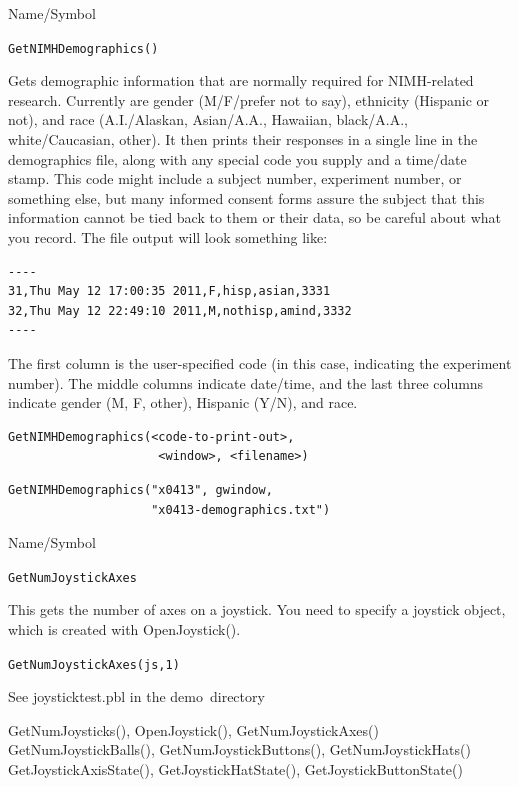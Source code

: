 \begin{desc}{Name/Symbol}
\item[Name/Symbol]	\verb+GetNIMHDemographics()+

\item[Description]	Gets demographic information that are normally required for NIMH-related research.  Currently are gender (M/F/prefer not to say), ethnicity (Hispanic or not), and race (A.I./Alaskan, Asian/A.A., Hawaiian, black/A.A., white/Caucasian, other).  
		It then prints their responses in a single line in the demographics file, along with any special code you supply and a time/date stamp. This code might include a subject number, experiment number, or something else, but many informed consent forms assure the subject that this information cannot be tied back to them or their data, so be careful about what you record. The file output will look something like: 
\begin{verbatim}
---- 
31,Thu May 12 17:00:35 2011,F,hisp,asian,3331
32,Thu May 12 22:49:10 2011,M,nothisp,amind,3332
---- 
\end{verbatim}


	The first column is the user-specified code (in this 
	case, indicating the experiment number).  The middle columns 
	indicate date/time, and the last three columns indicate 
	gender (M, F, other), Hispanic (Y/N), and race.

\item[Usage]
\begin{verbatim}
GetNIMHDemographics(<code-to-print-out>,
                     <window>, <filename>)
\end{verbatim} 

\item[Example]
\begin{verbatim}
GetNIMHDemographics("x0413", gwindow, 
                    "x0413-demographics.txt")
\end{verbatim}

\item[See Also]	
\end{desc}


\begin{desc}{Name/Symbol}
\item[Name/Symbol] \verb+GetNumJoystickAxes+ 

\item[Description]  
  This gets the number of axes on a joystick.  You need to specify a joystick object, which is created with OpenJoystick(). 

\item[Usage]          \verb+GetNumJoystickAxes(js,1)+ 

\item[Example]
See joysticktest.pbl in the demo\ directory

\item[See Also]
GetNumJoysticks(), OpenJoystick(), GetNumJoystickAxes()
GetNumJoystickBalls(), GetNumJoystickButtons(), GetNumJoystickHats()
GetJoystickAxisState(), GetJoystickHatState(), GetJoystickButtonState()
\end{desc} 

